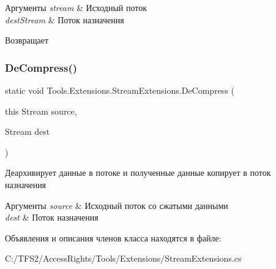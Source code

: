 \begin{DoxyParams}{Аргументы}
{\em stream} & Исходный поток\\
\hline
{\em dest\+Stream} & Поток назначения\\
\hline
\end{DoxyParams}
\begin{DoxyReturn}{Возвращает}

\end{DoxyReturn}
\mbox{\label{class_tools_1_1_extensions_1_1_stream_extensions_a22c19f0b95ef6910c8645aab213e3524}} 
\subsubsection{\texorpdfstring{De\+Compress()}{DeCompress()}}
{\footnotesize\ttfamily static void Tools.\+Extensions.\+Stream\+Extensions.\+De\+Compress (\begin{DoxyParamCaption}\item[{this Stream}]{source,  }\item[{Stream}]{dest }\end{DoxyParamCaption})\hspace{0.3cm}{\ttfamily [static]}}



Деархивирует данные в потоке и полученные данные копирует в поток назначения 


\begin{DoxyParams}{Аргументы}
{\em source} & Исходный поток со сжатыми данными\\
\hline
{\em dest} & Поток назначения\\
\hline
\end{DoxyParams}


Объявления и описания членов класса находятся в файле\+:\begin{DoxyCompactItemize}
\item 
C\+:/\+T\+F\+S2/\+Access\+Rights/\+Tools/\+Extensions/Stream\+Extensions.\+cs\end{DoxyCompactItemize}
